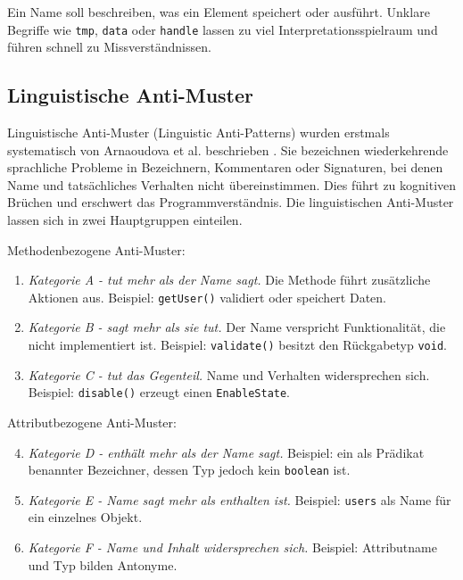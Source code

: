 \documentclass[a4paper,12pt]{article}
\begin{document}
Ein Name soll beschreiben, was ein Element speichert oder ausführt. Unklare
Begriffe wie \texttt{tmp}, \texttt{data} oder \texttt{handle} lassen zu viel
Interpretationsspielraum und führen schnell zu Missverständnissen.

\subsection{Linguistische Anti-Muster}

Linguistische Anti-Muster (Linguistic Anti-Patterns) wurden erstmals
systematisch von Arnaoudova et al. beschrieben \cite{arnaoudova2014}. Sie
bezeichnen wiederkehrende sprachliche Probleme in Bezeichnern, Kommentaren oder
Signaturen, bei denen Name und tatsächliches Verhalten nicht übereinstimmen.
Dies führt zu kognitiven Brüchen und erschwert das Programmverständnis. Die linguistischen Anti-Muster lassen sich in zwei Hauptgruppen einteilen.

Methodenbezogene Anti-Muster:

\begin{enumerate}
    \item \textit{Kategorie A - tut mehr als der Name sagt.}
          Die Methode führt zusätzliche Aktionen aus.
          Beispiel: \texttt{getUser()} validiert oder speichert Daten.

    \item \textit{Kategorie B - sagt mehr als sie tut.}
          Der Name verspricht Funktionalität, die nicht implementiert ist.
          Beispiel: \texttt{validate()} besitzt den Rückgabetyp \texttt{void}.

    \item \textit{Kategorie C - tut das Gegenteil.}
          Name und Verhalten widersprechen sich.
          Beispiel: \texttt{disable()} erzeugt einen \texttt{EnableState}.
\end{enumerate}

Attributbezogene Anti-Muster:
\begin{enumerate}
    \setcounter{enumi}{3}
    \item \textit{Kategorie D - enthält mehr als der Name sagt.}
          Beispiel: ein als Prädikat benannter Bezeichner, dessen Typ jedoch kein \texttt{boolean} ist.

    \item \textit{Kategorie E - Name sagt mehr als enthalten ist.}
          Beispiel: \texttt{users} als Name für ein einzelnes Objekt.

    \item \textit{Kategorie F - Name und Inhalt widersprechen sich.}
          Beispiel: Attributname und Typ bilden Antonyme.
\end{enumerate}
\end{document}
